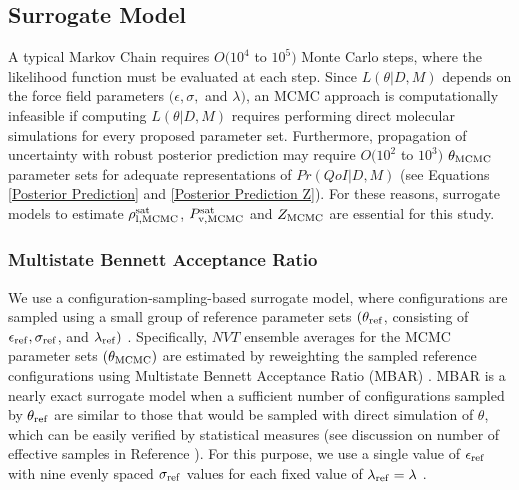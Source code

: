 \documentclass[preprint,letterpaper,floatfix,citeautoscript,aip,jcp]{revtex4-1}
\begin{document}
\subsection{Surrogate Model} \label{Surrogate Model}

A typical Markov Chain requires $O(10^4$ to $10^5)$ Monte Carlo steps, where the likelihood function must be evaluated at each step. Since $L(\theta|D,M)$ depends on the force field parameters $(\epsilon, \sigma, $ and $\lambda)$, an MCMC approach is computationally infeasible if computing $L(\theta|D,M)$ requires performing direct molecular simulations for every proposed parameter set. Furthermore, propagation of uncertainty with robust posterior prediction may require $O(10^2$ to $10^3)$ $\theta_{\rm MCMC}$ parameter sets for adequate representations of $Pr(QoI|D,M)$ (see Equations \ref{Posterior Prediction} and \ref{Posterior Prediction Z}). For these reasons, surrogate models to estimate $\rho_{\rm l, MCMC}^{\rm sat}$, $P_{\rm v, MCMC}^{\rm sat}$ and $Z_{\rm MCMC}$ are essential for this study.


\subsubsection{Multistate Bennett Acceptance Ratio}

We use a configuration-sampling-based surrogate model, where configurations are sampled using a small group of reference parameter sets $(\theta_{\rm ref}$, consisting of $\epsilon_{\rm ref}, \sigma_{\rm ref}$, and $\lambda_{\rm ref})$ \cite{Postdoc_1}. Specifically, $NVT$ ensemble averages for the MCMC parameter sets $(\theta_{\rm MCMC})$ are estimated by reweighting the sampled reference configurations using Multistate Bennett Acceptance Ratio (MBAR) \cite{shirts-chodera:jcp:2008:mbar}. MBAR is a nearly exact surrogate model when a sufficient number of configurations sampled by $\theta_{\rm ref}$ are similar to those that would be sampled with direct simulation of $\theta$,
which can be easily verified by statistical measures 
(see discussion on number of effective samples in Reference ). For this purpose, we use a single value of $\epsilon_{\rm ref}$ with nine evenly spaced $\sigma_{\rm ref}$ values for 
each fixed value of $\lambda_{\rm ref} = \lambda$ \cite{Postdoc_1}.  
\end{document}
